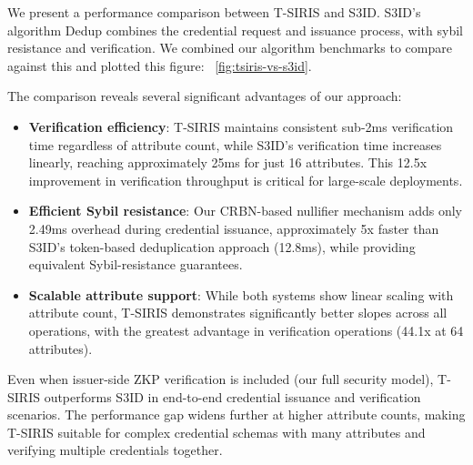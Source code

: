 We present a performance comparison between T-SIRIS and S3ID. S3ID's algorithm Dedup combines the credential request and issuance process, with sybil resistance and verification. We combined our algorithm benchmarks to compare against this and plotted this figure: ~\ref{fig:tsiris-vs-s3id}.

The comparison reveals several significant advantages of our approach:

\begin{itemize}
    
    \item \textbf{Verification efficiency}: T-SIRIS maintains consistent sub-2ms verification time regardless of attribute count, while S3ID's verification time increases linearly, reaching approximately 25ms for just 16 attributes. This 12.5x improvement in verification throughput is critical for large-scale deployments.
    
    \item \textbf{Efficient Sybil resistance}: Our CRBN-based nullifier mechanism adds only 2.49ms overhead during credential issuance, approximately 5x faster than S3ID's token-based deduplication approach (12.8ms), while providing equivalent Sybil-resistance guarantees.
    
    \item \textbf{Scalable attribute support}: While both systems show linear scaling with attribute count, T-SIRIS demonstrates significantly better slopes across all operations, with the greatest advantage in verification operations (44.1x at 64 attributes).
\end{itemize}

Even when issuer-side ZKP verification is included (our full security model), T-SIRIS outperforms S3ID in end-to-end credential issuance and verification scenarios. The performance gap widens further at higher attribute counts, making T-SIRIS suitable for complex credential schemas with many attributes and verifying multiple credentials together.


